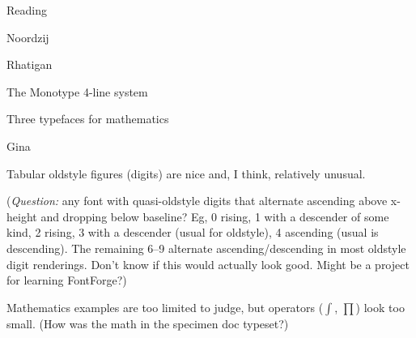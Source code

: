 \documentclass[11pt]{PalisadesLakesBook}
\begin{document}
\begin{plSection}{Reading}
\begin{plSection}{Noordzij}



\end{plSection}%

\begin{plSection}{Rhatigan}

\begin{plSection}{The Monotype 4-line system}


\end{plSection}%

\begin{plSection}{Three typefaces for mathematics}


\end{plSection}%

\begin{plSection}{Gina}



Tabular oldstyle figures (digits) are nice and, I think,
relatively unusual.

(\emph{Question:} any font with quasi-oldstyle digits that alternate 
ascending above x-height and dropping below baseline?
Eg, 0 rising, 1 with a descender of some kind, 2 rising, 3 with
a descender (usual for oldstyle), 4 ascending (usual is descending).
The remaining 6--9 alternate ascending/descending in most
oldstyle digit renderings.
Don't know if this would actually look good.
Might be a project for learning FontForge?)


Mathematics examples are too limited to judge, 
but operators ($\int$, $\prod$) look too small. 
(How was the math in the specimen doc typeset?)

\end{plSection}%

\end{plSection}%
\end{plSection}%
\BeginAppendices

\end{document}

